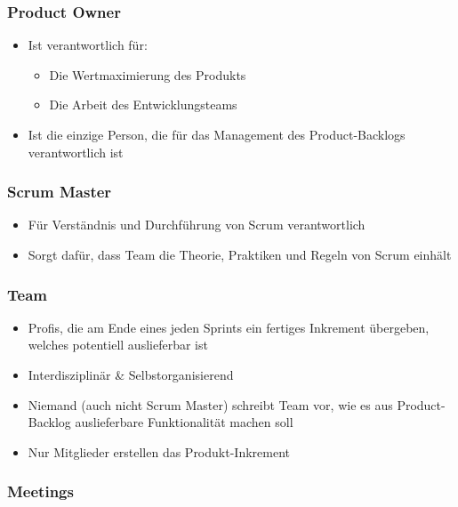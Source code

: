 \documentclass[11pt, a4paper]{article}
\begin{document}
\raggedright


\subsubsection*{Product Owner}

\begin{itemize}
    \item Ist verantwortlich für:
    \begin{itemize}
        \item Die Wertmaximierung des Produkts
        \item Die Arbeit des Entwicklungsteams
    \end{itemize}
    \item Ist die einzige Person, die für das Management des Product-Backlogs verantwortlich ist
\end{itemize}


\subsubsection*{Scrum Master}

\begin{itemize}
    \item Für Verständnis und Durchführung von Scrum verantwortlich
    \item Sorgt dafür, dass Team die Theorie, Praktiken und Regeln von Scrum einhält
\end{itemize}


\subsubsection*{Team}

\begin{itemize}
    \item Profis, die am Ende eines jeden Sprints ein fertiges Inkrement übergeben, welches potentiell auslieferbar ist
    \item Interdisziplinär \& Selbstorganisierend
    \item Niemand (auch nicht Scrum Master) schreibt Team vor, wie es aus Product-Backlog auslieferbare Funktionalität machen soll
    \item Nur Mitglieder erstellen das Produkt-Inkrement
\end{itemize}

\newpage

\subsubsection{Meetings}
\end{document}
